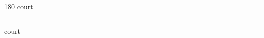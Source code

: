 
\begin{frame}
\begin{center}
\begin{turn}{180}
{\fontsize{2.5cm}{1em}\selectfont court}
\end{turn}
\vspace{1em}\par  
\hrule
\vspace{1em}\par  
{\fontsize{2.5cm}{1em}\selectfont court}
\end{center}
\end{frame}
